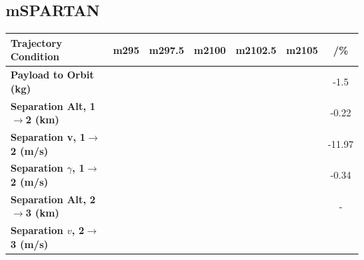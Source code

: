 \subsection{mSPARTAN}\label{sec:SpartanMassnoreturn}



\begin{table}[ht]
	\centering
	
	
	\begin{tabular}{l c c c c c c} 
		\hline \textbf{Trajectory Condition}
		&m295
		&m297.5
		&m2100
		&m2102.5
		&m2105
		& /\%
		\\
		\hline \textbf{Payload to Orbit (kg)}
		& \PayloadToOrbitmSPARTANNinetyFiveNoReturn
		& \PayloadToOrbitmSPARTANNinetySevenFiveNoReturn
		& \PayloadToOrbitmSPARTANStandardNoReturn
		& \PayloadToOrbitmSPARTANOneHundredTwoFiveNoReturn
		& \PayloadToOrbitmSPARTANOneHundredFiveNoReturn
		&-1.5
		\\
		\textbf{Separation Alt, 1$\rightarrow$2 (km)}
		& \firstsecondSeparationAltmSPARTANNinetyFiveNoReturn
		& \firstsecondSeparationAltmSPARTANNinetySevenFiveNoReturn
		& \firstsecondSeparationAltmSPARTANStandardNoReturn
		& \firstsecondSeparationAltmSPARTANOneHundredTwoFiveNoReturn
		& \firstsecondSeparationAltmSPARTANOneHundredFiveNoReturn
		&-0.22
		\\
		\textbf{Separation v, 1$\rightarrow$2 (m/s)}
		& \firstsecondSeparationvmSPARTANNinetyFiveNoReturn
		& \firstsecondSeparationvmSPARTANNinetySevenFiveNoReturn
		& \firstsecondSeparationvmSPARTANStandardNoReturn
		& \firstsecondSeparationvmSPARTANOneHundredTwoFiveNoReturn
		& \firstsecondSeparationvmSPARTANOneHundredFiveNoReturn
		&-11.97
		\\
		\textbf{Separation $\gamma$, 1$\rightarrow$2 (m/s)}
		& \firstsecondSeparationgammamSPARTANNinetyFiveNoReturn
		& \firstsecondSeparationgammamSPARTANNinetySevenFiveNoReturn
		& \firstsecondSeparationgammamSPARTANStandardNoReturn
		& \firstsecondSeparationgammamSPARTANOneHundredTwoFiveNoReturn
		& \firstsecondSeparationgammamSPARTANOneHundredFiveNoReturn
		&-0.34
		\\
		\textbf{Separation Alt, 2$\rightarrow$3 (km)}
		& \secondthirdSeparationAltmSPARTANNinetyFiveNoReturn
		& \secondthirdSeparationAltmSPARTANNinetySevenFiveNoReturn
		& \secondthirdSeparationAltmSPARTANStandardNoReturn
		& \secondthirdSeparationAltmSPARTANOneHundredTwoFiveNoReturn
		& \secondthirdSeparationAltmSPARTANOneHundredFiveNoReturn
		& -
		\\
		\textbf{Separation $v$, 2$\rightarrow$3 (m/s)}
		& \secondthirdSeparationvmSPARTANNinetyFiveNoReturn

\end{tabular}
\end{table}
